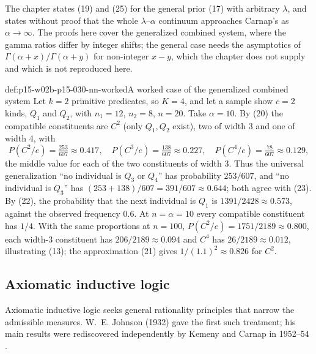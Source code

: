 The chapter states (19) and (25) for the general prior (17) with
arbitrary \(\lambda\), and states without proof that the whole
\(\lambda\)--\(\alpha\) continuum approaches Carnap's as
\(\alpha\to\infty\). The proofs here cover the generalized combined
system, where the gamma ratios differ by integer shifts; the general
case needs the asymptotics of \(\Gamma(\alpha+x)/\Gamma(\alpha+y)\) for
non-integer \(x-y\), which the chapter does not supply and which is not
reproduced here.

\begin{hbexample}{def:p15-w02b-p15-030-nn-worked}{A worked case of the generalized combined system}
Let \(k=2\) primitive predicates, so \(K=4\), and let a sample show
\(c=2\) kinds, \(Q_1\) and \(Q_2\), with \(n_1=12\), \(n_2=8\), \(n=20\).
Take \(\alpha=10\). By (20) the compatible constituents are \(C^2\)
(only \(Q_1,Q_2\) exist), two of width 3 and one of width 4, with
\[
 P(C^2/e)=\tfrac{253}{607}\approx0.417,\quad
 P(C^3/e)=\tfrac{138}{607}\approx0.227,\quad
 P(C^4/e)=\tfrac{78}{607}\approx0.129,
\]
the middle value for each of the two constituents of width 3.
Thus the universal generalization ``no individual is \(Q_3\) or
\(Q_4\)'' has probability \(253/607\), and ``no individual is \(Q_3\)''
has \((253+138)/607=391/607\approx0.644\); both agree with (23). By (22),
the probability that the next individual is \(Q_1\) is
\(1391/2428\approx0.573\), against the observed frequency \(0.6\). At
\(n=\alpha=10\) every compatible constituent has \(1/4\). With the same
proportions at \(n=100\), \(P(C^2/e)=1751/2189\approx0.800\), each width-3
constituent has \(206/2189\approx0.094\) and \(C^4\) has
\(26/2189\approx0.012\), illustrating (13); the approximation (21) gives
\(1/(1.1)^2\approx0.826\) for \(C^2\).
\end{hbexample}

\subsection{Axiomatic inductive logic}
\label{sec:p15-w02b-p15-030-nn-axioms}

Axiomatic inductive logic seeks general rationality principles that
narrow the admissible measures. W.~E. Johnson (1932) gave the first such
treatment; his main results were rediscovered independently by Kemeny and
Carnap in 1952--54 \cite[p.~322]{Niiniluoto2011HintikkaProgramReading}.

